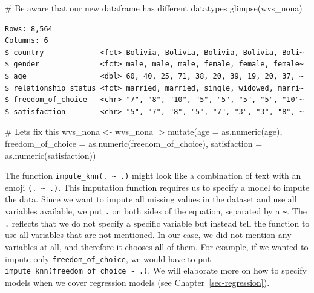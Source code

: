 \documentclass[
  letterpaper,
  DIV=11,
  numbers=noendperiod]{scrreprt}
\newenvironment{Shaded}{\begin{snugshade}}{\end{snugshade}}
\newcommand{\AttributeTok}[1]{\textcolor[rgb]{0.40,0.45,0.13}{#1}}
\newcommand{\CommentTok}[1]{\textcolor[rgb]{0.37,0.37,0.37}{#1}}
\newcommand{\FunctionTok}[1]{\textcolor[rgb]{0.28,0.35,0.67}{#1}}
\newcommand{\NormalTok}[1]{\textcolor[rgb]{0.00,0.23,0.31}{#1}}
\newcommand{\OtherTok}[1]{\textcolor[rgb]{0.00,0.23,0.31}{#1}}
\newcommand{\SpecialCharTok}[1]{\textcolor[rgb]{0.37,0.37,0.37}{#1}}
\begin{document}
\begin{Shaded}
\begin{Highlighting}[]
\CommentTok{\# Be aware that our new dataframe has different datatypes}
\FunctionTok{glimpse}\NormalTok{(wvs\_nona)}
\end{Highlighting}
\end{Shaded}

\begin{verbatim}
Rows: 8,564
Columns: 6
$ country             <fct> Bolivia, Bolivia, Bolivia, Bolivia, Boli~
$ gender              <fct> male, male, male, female, female, female~
$ age                 <dbl> 60, 40, 25, 71, 38, 20, 39, 19, 20, 37, ~
$ relationship_status <fct> married, married, single, widowed, marri~
$ freedom_of_choice   <chr> "7", "8", "10", "5", "5", "5", "5", "10"~
$ satisfaction        <chr> "5", "7", "8", "5", "7", "3", "3", "8", ~
\end{verbatim}

\begin{Shaded}
\begin{Highlighting}[]
\CommentTok{\# Let\textquotesingle{}s fix this}
\NormalTok{wvs\_nona }\OtherTok{\textless{}{-}}
\NormalTok{  wvs\_nona }\SpecialCharTok{|\textgreater{}}
  \FunctionTok{mutate}\NormalTok{(}\AttributeTok{age =} \FunctionTok{as.numeric}\NormalTok{(age),}
         \AttributeTok{freedom\_of\_choice =} \FunctionTok{as.numeric}\NormalTok{(freedom\_of\_choice),}
         \AttributeTok{satisfaction =} \FunctionTok{as.numeric}\NormalTok{(satisfaction))}
\end{Highlighting}
\end{Shaded}

The function \texttt{impute\_knn(.\ \textasciitilde{}\ .)} might look
like a combination of text with an emoji
\texttt{(.\ \textasciitilde{}\ .)}. This imputation function requires us
to specify a model to impute the data. Since we want to impute all
missing values in the dataset and use all variables available, we put
\texttt{.} on both sides of the equation, separated by a
\texttt{\textasciitilde{}}. The \texttt{.} reflects that we do not
specify a specific variable but instead tell the function to use all
variables that are not mentioned. In our case, we did not mention any
variables at all, and therefore it chooses all of them. For example, if
we wanted to impute only \texttt{freedom\_of\_choice}, we would have to
put \texttt{impute\_knn(freedom\_of\_choice\ \textasciitilde{}\ .)}. We
will elaborate more on how to specify models when we cover regression
models (see Chapter~\ref{sec-regression}).
\end{document}
